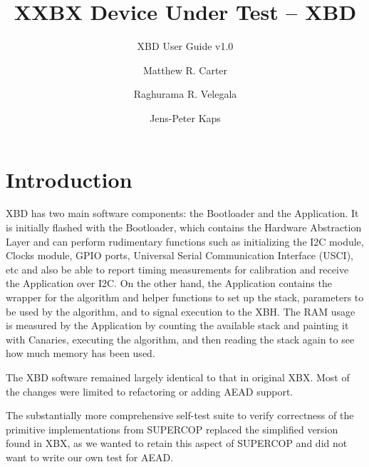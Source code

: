 \documentclass[twoside,11pt]{cergdoc}
\begin{document}


\title{XXBX Device Under Test -- XBD}
\subtitle{XBD User Guide v1.0}
\author{Matthew R. Carter \and Raghurama R. Velegala \and Jens-Peter Kaps}

\maketitle

\tableofcontents

\chapter{Introduction}
XBD has two main software components: the Bootloader and
the Application. It is initially flashed with the Bootloader, which
contains the Hardware Abstraction Layer and can perform
rudimentary functions such as initializing the I2C module,
Clocks module, GPIO ports, Universal Serial Communication
Interface (USCI), etc and also be able to report timing
measurements for calibration and receive the Application over
I2C.
On the other hand, the Application contains the wrapper for the
algorithm and helper functions to set up the stack, parameters to
be used by the algorithm, and to signal execution to the XBH.
The RAM usage is measured by the Application by counting the
available stack and painting it with Canaries, executing the
algorithm, and then reading the stack again to see how much
memory has been used.






The XBD software remained largely identical to that in original XBX. Most of the
changes were limited to refactoring or adding AEAD support. 

The substantially more comprehensive self-test suite to verify correctness of
the primitive implementations from SUPERCOP replaced the simplified version
found in XBX, as we wanted to retain this aspect of SUPERCOP and did not want to
write our own test for AEAD. 
\end{document}
